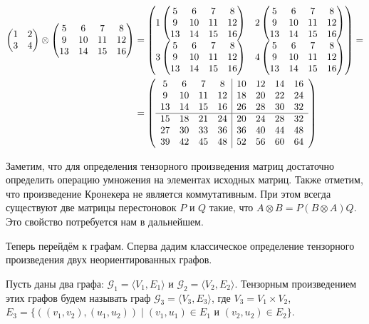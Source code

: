 
\begin{example}
\begin{align}
\begin{pmatrix}
1 & 2 \\
3 & 4
\end{pmatrix}
\otimes
\begin{pmatrix} 5 & 6 & 7 & 8 \\ 9 & 10 & 11 & 12 \\ 13 & 14 & 15 & 16 \end{pmatrix} &=
\begin{pmatrix}
1\begin{pmatrix} 5 & 6 & 7 & 8 \\ 9 & 10 & 11 & 12 \\ 13 & 14 & 15 & 16 \end{pmatrix} & 2\begin{pmatrix} 5 & 6 & 7 & 8 \\ 9 & 10 & 11 & 12 \\ 13 & 14 & 15 & 16 \end{pmatrix} \\
3\begin{pmatrix} 5 & 6 & 7 & 8 \\ 9 & 10 & 11 & 12 \\ 13 & 14 & 15 & 16 \end{pmatrix} & 4\begin{pmatrix} 5 & 6 & 7 & 8 \\ 9 & 10 & 11 & 12 \\ 13 & 14 & 15 & 16 \end{pmatrix}
\end{pmatrix}
=\notag \\
&=
\left(\begin{array}{c c c c | c c c c}
5  & 6  & 7  & 8  & 10 & 12 & 14 & 16 \\
9  & 10 & 11 & 12 & 18 & 20 & 22 & 24 \\
13 & 14 & 15 & 16 & 26 & 28 & 30 & 32 \\
\hline
15 & 18 & 21 & 24 & 20 & 24 & 28 & 32 \\
27 & 30 & 33 & 36 & 36 & 40 & 44 & 48 \\
39 & 42 & 45 & 48 & 52 & 56 & 60 & 64 
\end{array}\right)
\end{align}
\end{example}

Заметим, что для определения тензорного произведения матриц достаточно определить операцию умножения на элементах исходных матриц.
Также отметим, что произведение Кронекера не является коммутативным.
При этом всегда существуют две матрицы перестоновок $P$ и $Q$ такие, что $A \otimes B = P(B \otimes A)Q$.
Это свойство потребуется нам в дальнейшем.

Теперь перейдём к графам.
Сперва дадим классическое определение тензорного произведения двух неориентированных графов.

\begin{definition}
Пусть даны два графа: $\mathcal{G}_1 = \langle V_1, E_1\rangle$ и $\mathcal{G}_2 = \langle V_2, E_2\rangle$. 
Тензорным произведением этих графов будем называть граф $\mathcal{G}_3 = \langle V_3, E_3\rangle$, где $V_3 = V_1 \times V_2$, $E_3 = \{ ((v_1,v_2),(u_1,u_2)) \mid (v_1,u_1) \in E_1 \text{ и } (v_2,u_2) \in E_2 \}$.
\end{definition}

